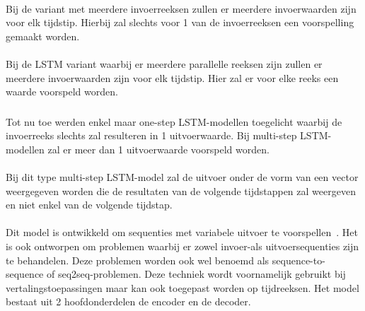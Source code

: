 \paragraph{}

Bij de variant met meerdere invoerreeksen zullen er meerdere invoerwaarden zijn voor elk tijdstip. Hierbij zal slechts voor 1 van de invoerreeksen een voorspelling gemaakt worden. 

\paragraph{}
Bij de LSTM variant waarbij er meerdere parallelle reeksen zijn zullen er meerdere invoerwaarden zijn voor elk tijdstip. Hier zal er voor elke reeks een waarde voorspeld worden.


\subsubsection{}

Tot nu toe werden enkel maar one-step LSTM-modellen toegelicht waarbij de invoerreeks slechts zal resulteren in 1 uitvoerwaarde. Bij multi-step LSTM-modellen zal er meer dan 1 uitvoerwaarde voorspeld worden.

\paragraph{}

Bij dit type multi-step LSTM-model zal de uitvoer onder de vorm van een vector weergegeven worden die de resultaten van de volgende tijdstappen zal weergeven en niet enkel van de volgende tijdstap. 

\paragraph{}


Dit model is ontwikkeld om sequenties met variabele uitvoer te voorspellen~\autocite{Brownlee2017a}. Het is ook ontworpen om problemen waarbij er zowel invoer-als uitvoersequenties zijn te behandelen. Deze problemen worden ook wel benoemd als sequence-to-sequence of seq2seq-problemen. Deze techniek wordt voornamelijk gebruikt bij vertalingstoepassingen maar kan ook toegepast worden op tijdreeksen. 
Het model bestaat uit 2 hoofdonderdelen de encoder en de decoder. 


